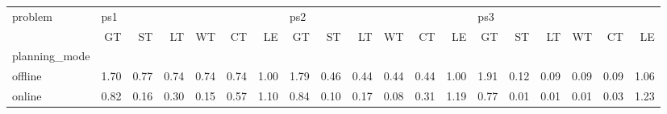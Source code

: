 \begin{tabular}{lrrrrrrrrrrrrrrrrrr}
\toprule
problem & \multicolumn{6}{l}{ps1} & \multicolumn{6}{l}{ps2} & \multicolumn{6}{l}{ps3} \\
{} &   GT &   ST &   LT &   WT &   CT &   LE &   GT &   ST &   LT &   WT &   CT &   LE &   GT &   ST &   LT &   WT &   CT &   LE \\
planning\_mode &      &      &      &      &      &      &      &      &      &      &      &      &      &      &      &      &      &      \\
\midrule
offline       & 1.70 & 0.77 & 0.74 & 0.74 & 0.74 & 1.00 & 1.79 & 0.46 & 0.44 & 0.44 & 0.44 & 1.00 & 1.91 & 0.12 & 0.09 & 0.09 & 0.09 & 1.06 \\
online        & 0.82 & 0.16 & 0.30 & 0.15 & 0.57 & 1.10 & 0.84 & 0.10 & 0.17 & 0.08 & 0.31 & 1.19 & 0.77 & 0.01 & 0.01 & 0.01 & 0.03 & 1.23 \\
\bottomrule
\end{tabular}

